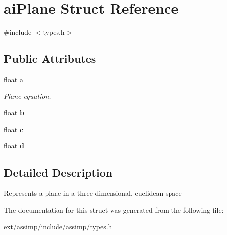 \hypertarget{structai_plane}{\section{ai\-Plane Struct Reference}
\label{structai_plane}
}


{\ttfamily \#include $<$types.\-h$>$}

\subsection*{Public Attributes}
\begin{DoxyCompactItemize}
\item 
\hypertarget{structai_plane_aeadf64e70e6daf1f7f431c90cfc8bce1}{float \hyperlink{structai_plane_aeadf64e70e6daf1f7f431c90cfc8bce1}{a}}\label{structai_plane_aeadf64e70e6daf1f7f431c90cfc8bce1}

\begin{DoxyCompactList}\small\item\em Plane equation. \end{DoxyCompactList}\item 
\hypertarget{structai_plane_a84ab33cd9b2f5325282b489f8a2bf11c}{float {\bfseries b}}\label{structai_plane_a84ab33cd9b2f5325282b489f8a2bf11c}

\item 
\hypertarget{structai_plane_a7b0ea36c355ca003a5789088fb24da1f}{float {\bfseries c}}\label{structai_plane_a7b0ea36c355ca003a5789088fb24da1f}

\item 
\hypertarget{structai_plane_ab8696b583b6fab46ae30cd5b691e7c9a}{float {\bfseries d}}\label{structai_plane_ab8696b583b6fab46ae30cd5b691e7c9a}

\end{DoxyCompactItemize}


\subsection{Detailed Description}
Represents a plane in a three-\/dimensional, euclidean space 

The documentation for this struct was generated from the following file\-:\begin{DoxyCompactItemize}
\item 
ext/assimp/include/assimp/\hyperlink{types_8h}{types.\-h}\end{DoxyCompactItemize}
